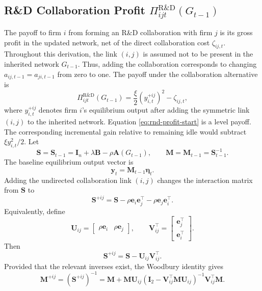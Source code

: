\subsection{R\&D Collaboration Profit $\Pi_{ijt}^{\text{R\&D}}(G_{t-1})$}
\label{sec:profit-rnd}
The payoff to firm $i$ from forming an R\&D collaboration with firm $j$ is its gross
profit in the updated network, net of the direct collaboration cost $\zeta_{ij,t}$.
Throughout this derivation, the link $(i,j)$ is assumed not to be present in the
inherited network $G_{t-1}$. Thus, adding the collaboration corresponds to changing
$a_{ij,t-1}=a_{ji,t-1}$ from zero to one. The payoff under the collaboration
alternative is
\begin{equation}
\Pi_{ijt}^{\text{R\&D}}(G_{t-1})
=
\frac{\xi}{2}
\left(y_{i,t}^{+ij}\right)^2
-
\zeta_{ij,t},
\label{eq:rnd-profit-start}
\end{equation}
where $y_{i,t}^{+ij}$ denotes firm $i$'s equilibrium output after adding the
symmetric link $(i,j)$ to the inherited network. Equation
\eqref{eq:rnd-profit-start} is a level payoff. The corresponding incremental gain
relative to remaining idle would subtract $\xi y_{i,t}^2/2$. Let
\[
\mathbf{S}
=
\mathbf{S}_{t-1}
=
\mathbf{I}_n+\lambda\mathbf{B}-\rho\mathbf{A}(G_{t-1}),
\qquad
\mathbf{M}
=
\mathbf{M}_{t-1}
=
\mathbf{S}_{t-1}^{-1}.
\]
The baseline equilibrium output vector is
\[
\mathbf{y}_t
=
\mathbf{M}_{t-1}\bm{\eta}_t.
\]
Adding the undirected collaboration link $(i,j)$ changes the interaction matrix from
$\mathbf{S}$ to
\begin{equation}
\mathbf{S}^{+ij}
=
\mathbf{S}
-
\rho\mathbf{e}_i\mathbf{e}_j^\top
-
\rho\mathbf{e}_j\mathbf{e}_i^\top .
\label{eq:S-plus-rnd}
\end{equation}
Equivalently, define
\[
\mathbf{U}_{ij}
=
\begin{bmatrix}
\rho\mathbf{e}_i & \rho\mathbf{e}_j
\end{bmatrix},
\qquad
\mathbf{V}_{ij}^{\top}
=
\begin{bmatrix}
\mathbf{e}_j^\top \\
\mathbf{e}_i^\top
\end{bmatrix}.
\]
Then
\begin{equation}
\mathbf{S}^{+ij}
=
\mathbf{S}
-
\mathbf{U}_{ij}\mathbf{V}_{ij}^{\top}.
\label{eq:S-plus-UV-rnd}
\end{equation}
Provided that the relevant inverses exist, the Woodbury identity gives
\begin{equation}
\mathbf{M}^{+ij}
=
\left(\mathbf{S}^{+ij}\right)^{-1}
=
\mathbf{M}
+
\mathbf{M}\mathbf{U}_{ij}
\left(
\mathbf{I}_2
-
\mathbf{V}_{ij}^{\top}\mathbf{M}\mathbf{U}_{ij}
\right)^{-1}
\mathbf{V}_{ij}^{\top}\mathbf{M}.
\label{eq:M-plus-rnd}
\end{equation}
